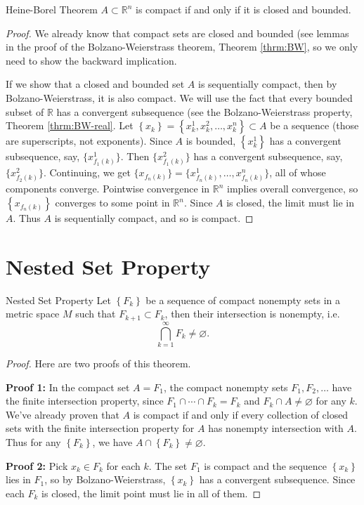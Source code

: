 \documentclass[10pt]{report}
\begin{document}
\begin{thrm}{Heine-Borel Theorem}{}
	$A \subset \mathbb{R}^n$ is compact if and only if it is closed and bounded.
\end{thrm}
\begin{proof}
	We already know that compact sets are closed and bounded (see lemmas in the proof of the Bolzano-Weierstrass theorem, Theorem \ref{thrm:BW}, so we only need to show the backward implication.

	If we show that a closed and bounded set $A$ is sequentially compact, then by Bolzano-Weierstrass, it is also compact. We will use the fact that every bounded subset of $\mathbb{R}$ has a convergent subsequence (see the Bolzano-Weierstrass property, Theorem \ref{thrm:BW-real}. Let $\left\{ x_k \right\}=\left\{ x_k^1,x_k^2,\dots,x_k^n \right\} \subset A$ be a sequence (those are superscripts, not exponents). Since $A$ is bounded, $\left\{ x_k^1 \right\}$ has a convergent subsequence, say, $\{ x_{f_1(k)}^1 \}$. Then $\{ x_{f_1(k)}^2 \}$ has a convergent subsequence, say, $\{ x_{f_2(k)}^2 \}$. Continuing, we get $\{ x_{f_n(k)} \} = \{ x_{f_n(k)}^1, \dots, x_{f_n(k)}^n \}$, all of whose components converge. Pointwise convergence in $\mathbb{R}^n$ implies overall convergence, so $\left\{ x_{f_n(k)} \right\}$ converges to some point in $\mathbb{R}^n$. Since $A$ is closed, the limit must lie in $A$. Thus $A$ is sequentially compact, and so is compact.
\end{proof}



\section{Nested Set Property}
\begin{thrm}{Nested Set Property}{}
	Let $\left\{ F_k \right\}$ be a sequence of compact nonempty sets in a metric space $M$ such that $F_{k+1}\subset F_k$, then their intersection is nonempty, i.e.
	 \[
	\bigcap_{k=1}^\infty F_k \neq \varnothing.
	\] 
\end{thrm}
\begin{proof}
	Here are two proofs of this theorem.

	\textbf{Proof 1:} In the compact set $A = F_1$, the compact nonempty sets $F_1,F_2,\dots$ have the finite intersection property, since $F_1\cap\cdots\cap F_k =F_k$ and $F_k \cap A \neq \varnothing$ for any $k$. We've already proven that $A$ is compact if and only if every collection of closed sets with the finite intersection property for $A$ has nonempty intersection with $A$. Thus for any $\left\{ F_k \right\}$, we have $A \cap \left\{ F_k \right\} \neq \varnothing$.

	\textbf{Proof 2:} Pick $x_k \in F_k$ for each $k$. The set $F_1$ is compact and the sequence $\left\{ x_k \right\}$ lies in $F_1$, so by Bolzano-Weierstrass, $\left\{ x_k \right\}$ has a convergent subsequence. Since each $F_k$ is closed, the limit point must lie in all of them.
\end{proof}
\end{document}
